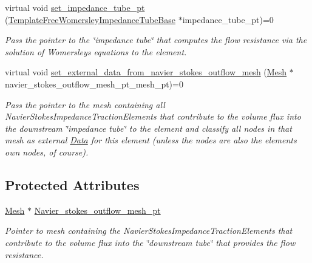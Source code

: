 \begin{DoxyCompactItemize}
virtual void \hyperlink{classoomph_1_1NavierStokesImpedanceTractionElementBase_add9c7ae3f33b8e03805c256daf038ab4}{set\+\_\+impedance\+\_\+tube\+\_\+pt} (\hyperlink{classoomph_1_1TemplateFreeWomersleyImpedanceTubeBase}{Template\+Free\+Womersley\+Impedance\+Tube\+Base} $\ast$impedance\+\_\+tube\+\_\+pt)=0
\begin{DoxyCompactList}\small\item\em Pass the pointer to the \char`\"{}impedance tube\char`\"{} that computes the flow resistance via the solution of Womersley\textquotesingle{}s equations to the element. \end{DoxyCompactList}\item 
virtual void \hyperlink{classoomph_1_1NavierStokesImpedanceTractionElementBase_a648cfcbd9bf1f3404b0e7f184cecdc62}{set\+\_\+external\+\_\+data\+\_\+from\+\_\+navier\+\_\+stokes\+\_\+outflow\+\_\+mesh} (\hyperlink{classoomph_1_1Mesh}{Mesh} $\ast$navier\+\_\+stokes\+\_\+outflow\+\_\+mesh\+\_\+pt\+\_\+mesh\+\_\+pt)=0
\begin{DoxyCompactList}\small\item\em Pass the pointer to the mesh containing all Navier\+Stokes\+Impedance\+Traction\+Elements that contribute to the volume flux into the downstream \char`\"{}impedance tube\char`\"{} to the element and classify all nodes in that mesh as external \hyperlink{classoomph_1_1Data}{Data} for this element (unless the nodes are also the element\textquotesingle{}s own nodes, of course). \end{DoxyCompactList}\end{DoxyCompactItemize}
\subsection*{Protected Attributes}
\begin{DoxyCompactItemize}
\item 
\hyperlink{classoomph_1_1Mesh}{Mesh} $\ast$ \hyperlink{classoomph_1_1NavierStokesImpedanceTractionElementBase_a460dbb1435dcd04e506b90d029513fc2}{Navier\+\_\+stokes\+\_\+outflow\+\_\+mesh\+\_\+pt}
\begin{DoxyCompactList}\small\item\em Pointer to mesh containing the Navier\+Stokes\+Impedance\+Traction\+Elements that contribute to the volume flux into the \char`\"{}downstream tube\char`\"{} that provides the flow resistance. \end{DoxyCompactList}\end{DoxyCompactItemize}


